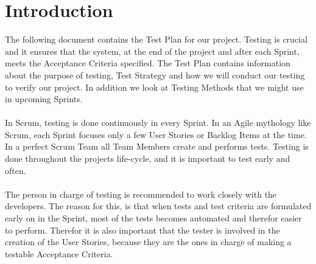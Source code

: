 \section{Introduction}
The following document contains the Test Plan for our project. Testing is crucial and it ensures that the system, at the end of the project and after each Sprint, meets the Acceptance Criteria specified. The Test Plan contains information about the purpose of testing, Test Strategy and how we will conduct our testing to verify our project. In addition we look at Testing Methods that we might use in upcoming Sprints.\\
\\
In Scrum, testing is done continuously in every Sprint. In an Agile mythology like Scrum, each Sprint focuses only a few User Stories or Backlog Items at the time. In a perfect Scrum Team all Team Members create and performs tests. Testing is done throughout the projects life-cycle, and it is important to test early and often.\\
\\
The person in charge of testing is recommended to work closely with the developers. The reason for this, is that when tests and test criteria are formulated early on in the Sprint, most of the tests becomes automated and therefor easier to perform. Therefor it is also important that the tester is involved in the creation of the User Stories, because they are the ones in charge of making a testable Acceptance Criteria.\\
\\


